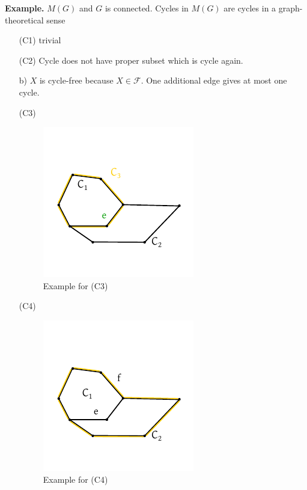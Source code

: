 \documentclass{article}
\begin{document}
\textbf{Example.}
  $M(G)$ and $G$ is connected.
  Cycles in $M(G)$ are cycles in a graph-theoretical sense
  \begin{itemize}
    \item[(C1)] trivial
    \item[(C2)] Cycle does not have proper subset which is cycle again.
    \item[b)] $X$ is cycle-free because $X \in \mathcal{F}$. One additional edge gives at most one cycle.
    \item[(C3)]
      \begin{figure}[!ht]
        \begin{center}
          \includegraphics{img/example_cycles.pdf}
          \caption{Example for (C3)}
        \end{center}
      \end{figure}
    \item[(C4)]
      \begin{figure}[!ht]
        \begin{center}
          \includegraphics{img/example_cycles_C4.pdf}
          \caption{Example for (C4)}
        \end{center}
      \end{figure}
  \end{itemize}
\end{document}
